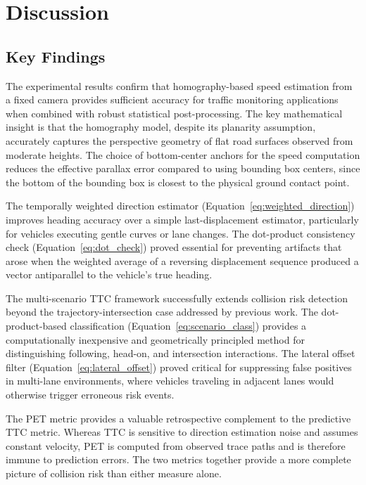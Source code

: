\documentclass[12pt]{report}
\begin{document}
\chapter{Discussion}

\section{Key Findings}

The experimental results confirm that homography-based speed estimation from a fixed camera provides sufficient accuracy for traffic monitoring applications when combined with robust statistical post-processing.
The key mathematical insight is that the homography model, despite its planarity assumption, accurately captures the perspective geometry of flat road surfaces observed from moderate heights.
The choice of bottom-center anchors for the speed computation reduces the effective parallax error compared to using bounding box centers, since the bottom of the bounding box is closest to the physical ground contact point.

The temporally weighted direction estimator (Equation~\eqref{eq:weighted_direction}) improves heading accuracy over a simple last-displacement estimator, particularly for vehicles executing gentle curves or lane changes.
The dot-product consistency check (Equation~\eqref{eq:dot_check}) proved essential for preventing artifacts that arose when the weighted average of a reversing displacement sequence produced a vector antiparallel to the vehicle's true heading.

The multi-scenario TTC framework successfully extends collision risk detection beyond the trajectory-intersection case addressed by previous work.
The dot-product-based classification (Equation~\eqref{eq:scenario_class}) provides a computationally inexpensive and geometrically principled method for distinguishing following, head-on, and intersection interactions.
The lateral offset filter (Equation~\eqref{eq:lateral_offset}) proved critical for suppressing false positives in multi-lane environments, where vehicles traveling in adjacent lanes would otherwise trigger erroneous risk events.

The PET metric provides a valuable retrospective complement to the predictive TTC metric.
Whereas TTC is sensitive to direction estimation noise and assumes constant velocity, PET is computed from observed trace paths and is therefore immune to prediction errors.
The two metrics together provide a more complete picture of collision risk than either measure alone.
\end{document}
